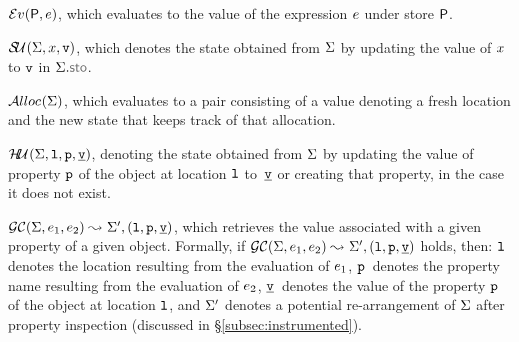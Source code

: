 \begin{description}
\setlength{\itemsep}{0.2em}
  \item[\jsil Expression Evaluation,] $\mathcal{E}v_{}({\sf P}, e)$, which evaluates to the value of the \jsil expression $e$ under store ${\sf P}$. 


  \item[Store Update,] $\mathcal{S\!U}_{}(\Sigma, x, \mathtt{v})$, which denotes the state obtained from $\Sigma$ 
             by updating the value of $x$  to $\mathtt{v}$ in $\absstate.\stosel$. 

  \item[Heap Allocation,] $\mathcal{A}lloc_{}(\Sigma)$, which evaluates to a pair consisting of a value denoting a fresh location and the new state that keeps track of that allocation. %
%             

   \item[Heap Update,] $\mathcal{H\!U}_{}(\Sigma, \mathtt{l}, \mathtt{p}, \underline{\mathtt{v}})$, denoting the state obtained from $\Sigma$ by updating the value of property $\mathtt{p}$ of the object at location $\mathtt{l}$ to~$\underline{\mathtt{v}}$ or creating that property, in the
             case it does not exist.

  \item[GetCell,] $\mathcal{GC}(\Sigma, e_1, e_2) \leadsto_{} \Sigma', (\mathtt{l}, \mathtt{p}, \underline{\mathtt{v}})$, which retrieves the value associated with a given property of a given object. Formally, if $\mathcal{GC}(\Sigma, e_1, e_2) \leadsto_{} \Sigma', (\mathtt{l}, \mathtt{p}, \underline{\mathtt{v}})$ holds, 
          then: $\mathtt{l}$ denotes the location resulting from the evaluation of $e_1$, 
          $\mathtt{p}$~denotes the property name resulting from the evaluation of $e_2$, 
          $\underline{\mathtt{v}}$~denotes the value of the property $\mathtt{p}$ of the object at location $\mathtt{l}$, 
          and $\Sigma'$ denotes a potential re-arrangement of $\Sigma$ after property inspection (discussed in \S\ref{subsec:instrumented}). 
            


\end{description}
